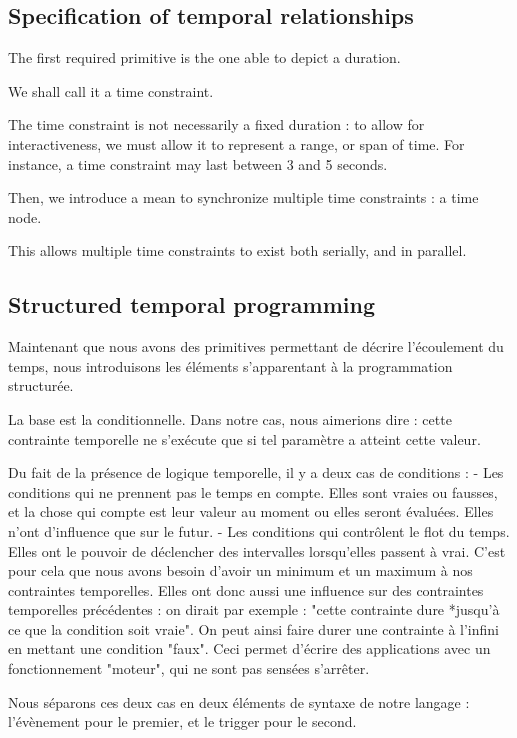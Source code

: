\documentclass{sigchi}
\begin{document}
\subsection{Specification of temporal relationships}\label{sec.temporal}
The first required primitive is the one able to depict a duration.

We shall call it a time constraint.

The time constraint is not necessarily a fixed duration : to allow for interactiveness, 
we must allow it to represent a range, or span of time. For instance, a time constraint may last between 3 and 5 seconds.

Then, we introduce a mean to synchronize multiple time constraints : a time node. 

This allows multiple time constraints to exist both serially, and in parallel. 


\subsection{Structured temporal programming}
Maintenant que nous avons des primitives permettant de décrire l'écoulement du temps, nous introduisons les éléments s'apparentant à la programmation structurée.

La base est la conditionnelle. Dans notre cas, nous aimerions dire : cette contrainte temporelle ne s'exécute que si tel paramètre a atteint cette valeur.

Du fait de la présence de logique temporelle, il y a deux cas de conditions : 
- Les conditions qui ne prennent pas le temps en compte. Elles sont vraies ou fausses, et la chose qui compte est leur valeur au moment ou elles seront évaluées. Elles n'ont d'influence que sur le futur.
- Les conditions qui contrôlent le flot du temps. Elles ont le pouvoir de déclencher des intervalles lorsqu'elles passent à vrai. C'est pour cela que nous avons besoin d'avoir un minimum et un maximum à nos contraintes temporelles. Elles ont donc aussi une influence sur des contraintes temporelles précédentes : on dirait par exemple : "cette contrainte dure *jusqu'à ce que la condition soit vraie". On peut ainsi faire durer une contrainte à l'infini en mettant une condition "faux". Ceci permet d'écrire des applications avec un fonctionnement "moteur", qui ne sont pas sensées s'arrêter.

Nous séparons ces deux cas en deux éléments de syntaxe de notre langage : l'évènement pour le premier, et le trigger pour le second.
\end{document}

